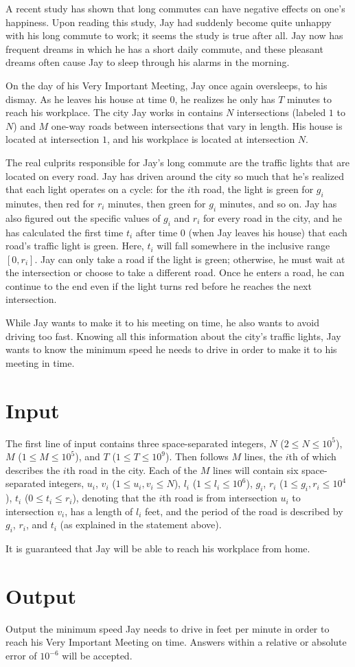 
A recent study has shown that long commutes can have negative effects on one's happiness. Upon reading
this study, Jay had suddenly become quite unhappy with his long commute to work; it seems the study is
true after all. Jay now has frequent dreams in which he has a short daily commute, and these pleasant
dreams often cause Jay to sleep through his alarms in the morning.

On the day of his Very Important Meeting, Jay once again oversleeps, to his dismay. As he leaves his house
at time $0$, he realizes he only has $T$ minutes to reach his workplace. The city Jay works in contains
$N$ intersections (labeled $1$ to $N$) and $M$ one-way roads between intersections that vary in length.
His house is located at intersection $1$, and his workplace is located at intersection $N$.

The real culprits responsible for Jay's long commute are the traffic lights that are located on every road.
Jay has driven around the city so much that he's realized that each light operates on a cycle: for the $i$th
road, the light is green for $g_i$ minutes, then red for $r_i$ minutes, then green for $g_i$ minutes, and so 
on. Jay has also figured out the specific values of $g_i$ and $r_i$ for every road in the city, and he has
calculated the first time $t_i$ after time $0$ (when Jay leaves his house) that each road's traffic light is
green. Here, $t_i$ will fall somewhere in the inclusive range $[0, r_i]$. Jay can only take a road if the
light is green; otherwise, he must wait at the intersection or choose to take a different road. Once he
enters a road, he can continue to the end even if the light turns red before he reaches the next
intersection.

While Jay wants to make it to his meeting on time, he also wants to avoid driving too fast. Knowing all
this information about the city's traffic lights, Jay wants to know the minimum speed he needs to drive
in order to make it to his meeting in time.

\section*{Input}

The first line of input contains three space-separated integers, $N$ ($2 \leq N \leq 10^5$), $M$
($1 \leq M \leq 10^5$), and $T$ ($1 \leq T \leq 10^9$). Then follows $M$ lines, the $i$th of which
describes the $i$th road in the city. Each of the $M$ lines will contain six space-separated integers,
$u_i$, $v_i$ ($1 \leq u_i, v_i \leq N$), $l_i$ ($1 \leq l_i \leq 10^6$), $g_i$, $r_i$
($1 \leq g_i, r_i \leq 10^4$), $t_i$ ($0 \leq t_i \leq r_i$), denoting that the $i$th road is from
intersection $u_i$ to intersection $v_i$, has a length of $l_i$ feet, and the period of the road is
described by $g_i$, $r_i$, and $t_i$ (as explained in the statement above).

It is guaranteed that Jay will be able to reach his workplace from home.

\section*{Output}

Output the minimum speed Jay needs to drive in feet per minute in order to reach his Very Important Meeting
on time. Answers within a relative or absolute error of $10^{-6}$ will be accepted.
